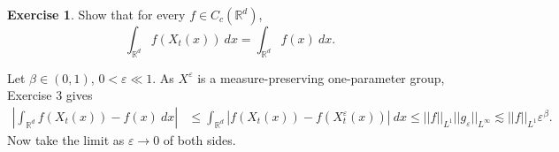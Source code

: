 \documentclass[10pt]{article}
\newcommand{\RR}{\mathbb{R}}
\renewcommand{\epsilon}{\varepsilon}
\theoremstyle{definition}
\newtheorem{exer}{Exercise}
\begin{document}
\begin{exer}
Show that for every $f \in C_c(\RR^d)$,
$$\int_{\RR^d} f(X_t(x)) ~dx = \int_{\RR^d} f(x) ~dx.$$
\end{exer}

Let $\beta \in (0, 1)$, $0 < \epsilon \ll 1$.
As $X^\epsilon$ is a measure-preserving one-parameter group, Exercise 3 gives
\begin{align*}
\left|\int_{\RR^d} f(X_t(x)) - f(x) ~dx\right| &\leq \int_{\RR^d} |f(X_t(x)) - f(X_t^\epsilon(x))| ~dx \leq ||f||_{L^1} ||g_\epsilon||_{L^\infty} \lesssim ||f||_{L^1} \epsilon^\beta.
\end{align*}
Now take the limit as $\epsilon \to 0$ of both sides.
\end{document}
